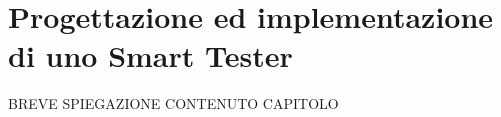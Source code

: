 \chapter{Progettazione ed implementazione di uno Smart Tester} %
%


\begin{citazione}
	BREVE SPIEGAZIONE CONTENUTO CAPITOLO
\end{citazione}

\newpage
